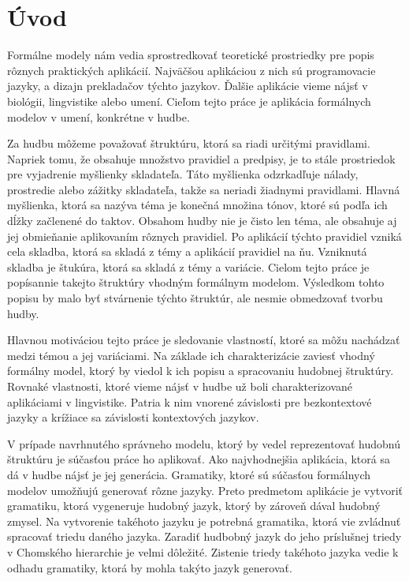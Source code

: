 \newtheorem{definition}{Definícia}[section]
\newtheorem{example}{Príklad}[section]

\def\UrlBreaks{\do\/\do-}

\chapter{Úvod}
Formálne modely nám vedia sprostredkovať teoretické prostriedky pre popis rôznych praktických aplikácií. Najväčšou aplikáciou z nich sú programovacie jazyky, a dizajn prekladačov týchto jazykov. Ďalšie aplikácie vieme nájsť v biológii, lingvistike alebo umení. Cieľom tejto práce je aplikácia formálnych modelov v umení, konkrétne v hudbe.

Za hudbu môžeme považovať štruktúru, ktorá sa riadi určitými pravidlami. Napriek tomu, že obsahuje množstvo pravidiel a predpisy, je to stále prostriedok pre vyjadrenie myšlienky skladateľa. Táto myšlienka odzrkadľuje nálady, prostredie alebo zážitky skladateľa, takže sa neriadi žiadnymi pravidlami. Hlavná myšlienka, ktorá sa nazýva téma je konečná množina tónov, ktoré sú podľa ich dĺžky začlenené do taktov. Obsahom hudby nie je čisto len téma, ale obsahuje aj jej obmieňanie aplikovaním rôznych pravidiel. Po aplikácií týchto pravidiel vzniká cela skladba, ktorá sa skladá z témy a aplikácií pravidiel na ňu. Vzniknutá skladba je štukúra, ktorá sa skladá z témy a variácie. Cielom tejto práce je popísannie takejto štruktúry vhodným formálnym modelom. Výsledkom tohto popisu by malo byť stvárnenie týchto štruktúr, ale nesmie obmedzovať tvorbu hudby.

Hlavnou motiváciou tejto práce je sledovanie vlastností, ktoré sa môžu nachádzať medzi témou a jej variáciami. Na základe ich charakterizácie zaviesť vhodný formálny model, ktorý by viedol k ich popisu a spracovaniu hudobnej štruktúry. Rovnaké vlastnosti, ktoré vieme nájsť v hudbe už boli charakterizované aplikáciami v lingvistike. Patria k nim vnorené závislosti pre bezkontextové jazyky a krížiace sa závislosti kontextových jazykov.

V prípade navrhnutého správneho modelu, ktorý by vedel reprezentovať hudobnú štruktúru je súčasťou práce ho aplikovať. Ako najvhodnejšia aplikácia, ktorá sa dá v hudbe nájsť je jej generácia. Gramatiky, ktoré sú súčasťou formálnych modelov umožňujú generovať rôzne jazyky. Preto predmetom aplikácie je vytvoriť gramatiku, ktorá vygeneruje hudobný jazyk, ktorý by zároveň dával hudobný zmysel. Na vytvorenie takéhoto jazyku je potrebná gramatika, ktorá vie zvládnuť spracovať triedu daného jazyka. Zaradiť hudbobný jazyk do jeho príslušnej triedy v Chomského hierarchie je velmi dôležité. Zistenie triedy takéhoto jazyka vedie k odhadu gramatiky, ktorá by mohla takýto jazyk generovať. 

